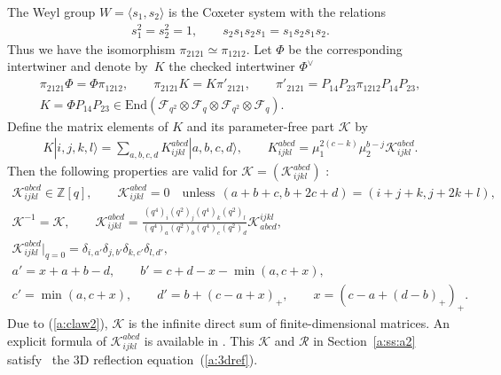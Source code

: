 \documentclass[pdftex]{sigma}
\begin{document}
The Weyl group $W=\langle s_1, s_2 \rangle$ is the Coxeter system
with the relations
\begin{gather*}
s_1^2=s_2^2=1,\qquad
s_2s_1s_2s_1 = s_1s_2s_1s_2.
\end{gather*}
Thus we have the isomorphism
$\pi_{2121} \simeq \pi_{1212}$.
Let $\Phi$ be the corresponding intertwiner and denote by~$K$
the checked intertwiner $\Phi^\vee$
\begin{gather*}
\pi_{2121} \Phi = \Phi  \pi_{1212},\qquad
\pi_{2121} K = K  \pi'_{2121},\qquad
\pi'_{2121} = P_{14}P_{23}\pi_{1212}P_{14}P_{23},\\
K = \Phi P_{14}P_{23} \in
\mathrm{End}(\mathcal{F}_{q^2}\otimes
\mathcal{F}_{q}\otimes
\mathcal{F}_{q^2}\otimes
\mathcal{F}_{q}).
\end{gather*}
Def\/ine the matrix elements of $K$ and its parameter-free part
$\mathscr{K}$ by
\begin{gather*}
K  |i,j,k,l \rangle=
\sum_{a,b,c,d}K^{abcd}_{ijkl}|a,b,c,d \rangle,
\qquad
K^{abcd}_{ijkl}  = \mu_1^{2(c-k)}\mu_2^{b-j}
\mathscr{K}^{abcd}_{ijkl}.
\end{gather*}
Then the following properties are valid for
$\mathscr{K} = (\mathscr{K}^{abcd}_{ijkl})$ \cite{KO1}:
\begin{gather}
\mathscr{K}^{abcd}_{ijkl} \in \mathbb{Z}[q],\qquad
\mathscr{K}^{abcd}_{ijkl}=0 \quad \mathrm{unless}\ \
(a+b+c, b+2c+d)=(i+j+k, j+2k+l),
\label{a:claw2}\\
\mathscr{K}^{-1} = \mathscr{K},\qquad
\mathscr{K}^{a b c d}_{i j k l}
= \frac{(q^4)_i(q^2)_j(q^4)_k(q^2)_l }{(q^4)_a(q^2)_b(q^4)_c(q^2)_d}
\mathscr{K}^{i j k l}_{a b c d},\label{a:kprop}\\
\mathscr{K}^{abcd}_{ijkl}|_{q=0}
= \delta_{i,a'}\delta_{j,b'}\delta_{k,c'}\delta_{l,d'},\label{a:k0}\\
a'=x + a + b - d,\qquad
b'=c + d - x-\min(a,c + x),\nonumber\\
  c'=\min(a,c+x),\qquad
d'= b+(c-a+x)_+,\qquad x=(c-a+(d-b)_+)_+.\nonumber
\end{gather}
Due to (\ref{a:claw2}), $\mathscr{K}$ is the inf\/inite direct sum
of f\/inite-dimensional matrices.
An explicit formula of $\mathscr{K}^{abcd}_{ijkl}$ is available
in \cite[equations~(3.27), (3.28)]{KO1}.
This $\mathscr{K}$ and $\mathscr{R}$ in Section~\ref{a:ss:a2} satisfy~\cite{KO1}
the 3D ref\/lection equation~(\ref{a:3dref}).
\end{document}
